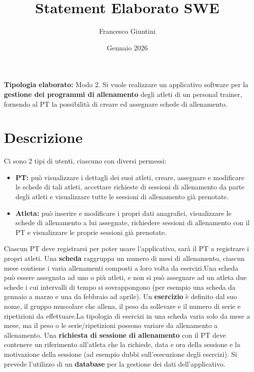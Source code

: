 \documentclass[12pt, letterpaper]{article}
\title{Statement Elaborato SWE}
\author{Francesco Giuntini}
\date{Gennaio 2026}
\begin{document}
\maketitle
\textbf{Tipologia elaborato:} Modo 2.\newline\newline
Si vuole realizzare un applicativo software per la \textbf{gestione
  dei programmi di allenamento} degli atleti di un personal trainer,
fornendo al PT la possibilità di creare ed assegnare schede
di allenamento.
\section{Descrizione}
Ci sono 2 tipi di utenti, ciascuno con diversi permessi:
\begin{itemize}
  \item \textbf{PT:} può visualizzare i dettagli dei suoi
    atleti, creare, assegnare e modificare le schede di tali
    atleti, accettare richieste di sessioni di allenamento da parte
    degli atleti e visualizzare tutte le sessioni di allenamento già prenotate.
  \item \textbf{Atleta:} può inserire e modificare i propri dati
    anagrafici, visualizzare le schede di allenamento a lui
    assegnate, richiedere sessioni di allenamento con il PT e
    visualizzare le proprie sessioni già prenotate.
\end{itemize}
Ciascun PT deve registrarsi per poter usare l'applicativo,
sarà il PT a registrare i propri atleti.\newline\newline
Una \textbf{scheda }raggruppa un numero di mesi di allenamento,
ciascun mese contiene i varia allenamenti composti a loro volta da
esercizi.\newline Una scheda può essere assegnata ad uno o più
atleti, e non si può assegnare ad un atleta due schede i cui
intervalli di tempo si sovrappongono (per esempio una scheda da
gennaio a marzo e una da febbraio ad aprile).\newline\newline
Un \textbf{esercizio} è definito dal suo nome, il gruppo muscolare
che allena, il peso da sollevare e il numero di serie e ripetizioni
da effettuare.\newline La tipologia di esercizi in una scheda varia
solo da mese a mese, ma il peso o le serie/ripetizioni possono
variare da allenamento a allenamento.\newline\newline
Una \textbf{richiesta di sessione di allenamento }con il PT
deve contenere un riferimento all'atleta che la richiede, data e ora
della sessione e la motivazione della sessione (ad esempio dubbi
sull'esecuzione degli esercizi).\newline\newline
Si prevede l'utilizzo di un \textbf{database} per la gestione dei
dati dell'applicativo.
\end{document}
